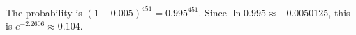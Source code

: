 The probability is $(1-0.005)^{451}=0.995^{451}$. Since $\ln0.995\approx-0.0050125$, this is $e^{-2.2606}\approx\boxed{0.104}$.

